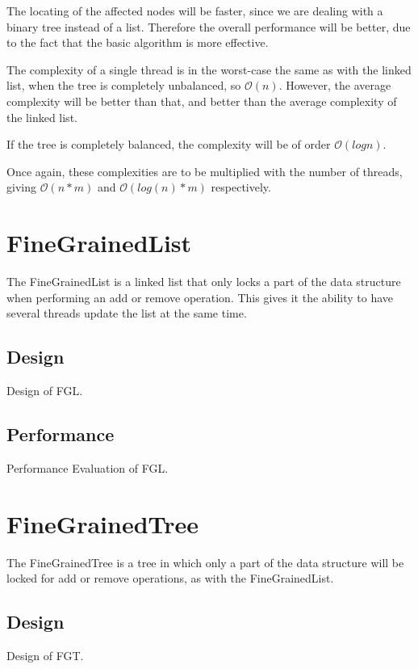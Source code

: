 \documentclass[a4paper]{article}
\begin{document}
The locating of the affected nodes will be faster, since we are dealing
with a binary tree instead of a list. Therefore the overall performance
will be better, due to the fact that the basic algorithm is more effective.

The complexity of a single thread is in the worst-case the same as with the
linked list, when the tree is completely unbalanced, so $\mathcal{O}(n)$.
However, the average complexity will be better than that, and better than the
average complexity of the linked list.

If the tree is completely balanced, the complexity will be of order
$\mathcal{O}(log n)$.

Once again, these complexities are to be multiplied with the number of
threads, giving $\mathcal{O}(n * m)$ and $\mathcal{O}(log(n) * m)$
respectively.

\section{FineGrainedList}

The FineGrainedList is a linked list that only locks a part of
the data structure when performing an add or remove operation. This
gives it the ability to have several threads update the list at the
same time.

\subsection{Design}

Design of FGL.

\subsection{Performance}

Performance Evaluation of FGL.

\section{FineGrainedTree}

The FineGrainedTree is a tree in which only a part of the data structure
will be locked for add or remove operations, as with the FineGrainedList.

\subsection{Design}

Design of FGT.
\end{document}
